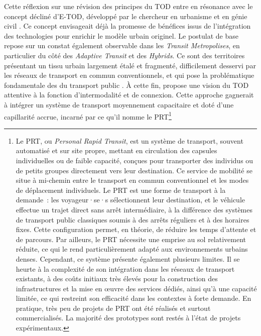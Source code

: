 \begin{refsegment}
Cette réflexion sur une révision des principes du \acrshort{TOD} entre en résonance avec le concept décliné d'\acrfull{E-TOD}, développé par le chercheur en urbanisme et en génie civil \textcolor{blue}{\textcite{schneider_illustrating_2012}}. Ce concept envisageait déjà la promesse de bénéfices issus de l’intégration des technologies pour enrichir le modèle urbain originel. Le postulat de base repose sur un constat également observable dans les \textsl{Transit Metropolises}, en particulier du côté des \textsl{Adaptive Transit} et des \textsl{Hybrids}. Ce sont des territoires présentant un tissu urbain largement étalé et fragmenté, difficilement desservi par les réseaux de transport en commun conventionnels, et qui pose la problématique fondamentale des  du transport public \textcolor{blue}{\autocite[133]{cervero_transit_2020}}. À cette fin, \textcolor{blue}{\textcite[141]{schneider_prt_1992}} propose une vision du \acrshort{TOD} attentive à la fonction d’intermodalité et de connexion. Cette approche gagnerait à intégrer un système de transport moyennement capacitaire et doté d’une capillarité accrue, incarné par ce qu’il nomme le \acrfull{PRT}\footnote{
    Le \acrfull{PRT}, ou \textsl{Personal Rapid Transit}, est un système de transport, souvent automatisé et sur site propre, mettant en circulation des capsules individuelles ou de faible capacité, conçues pour transporter des individus ou de petits groupes directement vers leur destination. Ce service de mobilité se situe à mi-chemin entre le transport en commun conventionnel et les modes de déplacement individuels. Le \acrshort{PRT} est une forme de transport à la demande~: les voyageur·se·s sélectionnent leur destination, et le véhicule effectue un trajet direct sans arrêt intermédiaire, à la différence des systèmes de transport public classiques soumis à des arrêts réguliers et à des horaires fixes. Cette configuration permet, en théorie, de réduire les temps d’attente et de parcours. Par ailleurs, le \acrshort{PRT} nécessite une emprise au sol relativement réduite, ce qui le rend particulièrement adapté aux environnements urbains denses. Cependant, ce système présente également plusieurs limites. Il se heurte à la complexité de son intégration dans les réseaux de transport existants, à des coûts initiaux très élevés pour la construction des infrastructures et la mise en œuvre des services dédiés, ainsi qu’à une capacité limitée, ce qui restreint son efficacité dans les contextes à forte demande. En pratique, très peu de projets de \acrshort{PRT} ont été réalisés et surtout commercialisés. La majorité des prototypes sont restés à l’état de projets expérimentaux.
}
\end{refsegment}

